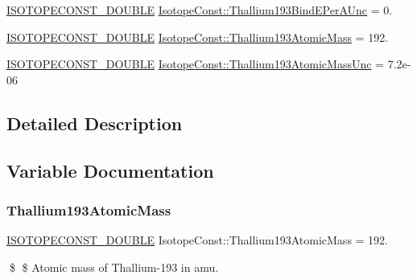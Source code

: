 \begin{DoxyCompactItemize}
\mbox{\hyperlink{group___isotope_const-_macros_ga8f45a7272ce02c0b4c65c44636ed719a}{I\+S\+O\+T\+O\+P\+E\+C\+O\+N\+S\+T\+\_\+\+D\+O\+U\+B\+LE}} \mbox{\hyperlink{group___isotope_const-_thallium-_tl193_gaa9087777828ab54f98103e630c32b237}{Isotope\+Const\+::\+Thallium193\+Bind\+E\+Per\+A\+Unc}} = 0.
\item 
\mbox{\hyperlink{group___isotope_const-_macros_ga8f45a7272ce02c0b4c65c44636ed719a}{I\+S\+O\+T\+O\+P\+E\+C\+O\+N\+S\+T\+\_\+\+D\+O\+U\+B\+LE}} \mbox{\hyperlink{group___isotope_const-_thallium-_tl193_ga070744bb27c79ac3bb80fbf28ee7c787}{Isotope\+Const\+::\+Thallium193\+Atomic\+Mass}} = 192.
\item 
\mbox{\hyperlink{group___isotope_const-_macros_ga8f45a7272ce02c0b4c65c44636ed719a}{I\+S\+O\+T\+O\+P\+E\+C\+O\+N\+S\+T\+\_\+\+D\+O\+U\+B\+LE}} \mbox{\hyperlink{group___isotope_const-_thallium-_tl193_ga40af48f0c94c40fe693be5210ca29256}{Isotope\+Const\+::\+Thallium193\+Atomic\+Mass\+Unc}} = 7.\+2e-\/06
\end{DoxyCompactItemize}


\subsection{Detailed Description}


\subsection{Variable Documentation}
\mbox{\label{group___isotope_const-_thallium-_tl193_ga070744bb27c79ac3bb80fbf28ee7c787}} 
\subsubsection{\texorpdfstring{Thallium193\+Atomic\+Mass}{Thallium193AtomicMass}}
{\footnotesize\ttfamily \mbox{\hyperlink{group___isotope_const-_macros_ga8f45a7272ce02c0b4c65c44636ed719a}{I\+S\+O\+T\+O\+P\+E\+C\+O\+N\+S\+T\+\_\+\+D\+O\+U\+B\+LE}} Isotope\+Const\+::\+Thallium193\+Atomic\+Mass = 192.}

\$ \$ Atomic mass of Thallium-\/193 in amu. \mbox{\label{group___isotope_const-_thallium-_tl193_ga40af48f0c94c40fe693be5210ca29256}} 
